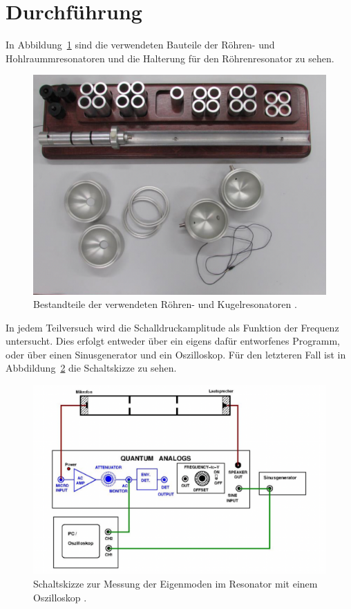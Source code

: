 \section{Durchführung}
In Abbildung~\ref{fig:resonatoren} sind die verwendeten Bauteile der Röhren- und Hohlraummresonatoren und die Halterung für den Röhrenresonator zu sehen.

\begin{figure}[H]
  \centering
  \includegraphics[width=12cm, keepaspectratio]{resonatoren.png}
  \caption{Bestandteile der verwendeten Röhren- und Kugelresonatoren \cite{anleitung}.}
  \label{fig:resonatoren}
\end{figure}

In jedem Teilversuch wird die Schalldruckamplitude als Funktion der Frequenz untersucht. Dies erfolgt entweder über ein eigens dafür entworfenes Programm, oder über einen Sinusgenerator und ein Oszilloskop. Für den letzteren Fall ist in Abbdildung~\ref{fig:schaltskizze} die Schaltskizze zu sehen.

\begin{figure}[H]
  \centering
  \includegraphics[width=12cm,keepaspectratio]{schaltskizze.png}
  \caption{Schaltskizze zur Messung der Eigenmoden im Resonator mit einem Oszilloskop \cite{anleitung}.}
  \label{fig:schaltskizze}
\end{figure}

